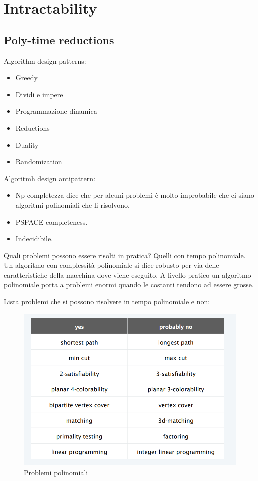 \documentclass{article}
\begin{document}
\section{Intractability}
\subsection{Poly-time reductions}
Algorithm design patterns:
\begin{itemize}
    \item Greedy
    \item Dividi e impere
    \item Programmazione dinamica
    \item Reductions
    \item Duality
    \item Randomization
\end{itemize}
Algoritmh design antipattern:
\begin{itemize}
    \item Np-completezza dice che per alcuni problemi è molto improbabile che ci siano algoritmi polinomiali che li risolvono. 
    \item PSPACE-completeness.
    \item Indecidibile.
\end{itemize}
\noindent Quali problemi possono essere risolti in pratica? Quelli con tempo polinomiale. Un algoritmo con complessità polinomiale si dice robusto per via delle caratteristiche della macchina dove viene eseguito.
A livello pratico un algoritmo polinomiale porta a problemi enormi quando le costanti tendono ad essere grosse.

\noindent Lista problemi che si possono risolvere in tempo polinomiale e non:
\begin{figure}[H]
    \centering
    \includegraphics[width=0.5\linewidth]{Screenshot 2024-05-09 120532.png}
    \caption{Problemi polinomiali}
    \label{fig:enter-label}
\end{figure}
\end{document}
